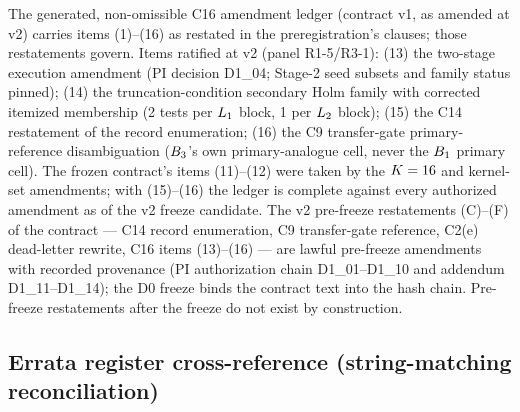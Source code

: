 The generated, non-omissible C16 amendment ledger (contract v1, as amended
at v2) carries items (1)--(16) as restated in the preregistration's
clauses; those restatements govern. Items ratified at v2 (panel R1-5/R3-1):
(13) the two-stage execution amendment (PI decision D1\_04; Stage-2 seed
subsets and family status pinned); (14) the truncation-condition secondary
Holm family with corrected itemized membership (2 tests per $L_{1}$ block, 1
per $L_{2}$ block); (15) the C14 restatement of the record enumeration;
(16) the C9 transfer-gate primary-reference disambiguation ($B_{3}$'s own
primary-analogue cell, never the $B_{1}$ primary cell). The frozen
contract's items (11)--(12) were taken by the $K = 16$ and kernel-set
amendments; with (15)--(16) the ledger is complete against every authorized
amendment as of the v2 freeze candidate. The v2 pre-freeze restatements
(C)--(F) of the contract --- C14 record enumeration, C9 transfer-gate
reference, C2(e) dead-letter rewrite, C16 items (13)--(16) --- are lawful
pre-freeze amendments with recorded provenance (PI authorization chain
D1\_01--D1\_10 and addendum D1\_11--D1\_14); the D0 freeze binds the
contract text into the hash chain. Pre-freeze restatements after the freeze
do not exist by construction.

\subsection{Errata register cross-reference (string-matching reconciliation)}
\label{app:prereg-errata}

